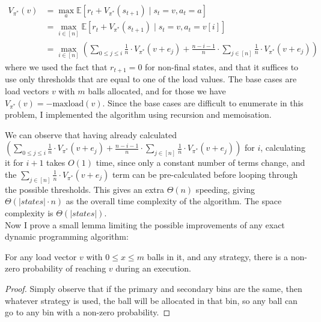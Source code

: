 \begin{equation} \label{eq:twothinning-dynamicprogramming}
\begin{split}
    V_{\pi^*}(v) &= \max_a \mathbb{E} [r_t + V_{\pi^*}(s_{t+1}) \mid s_t=v, a_t=a] \\
    &= \max_{i \in [n]} \mathbb{E} [r_t + V_{\pi^*}(s_{t+1}) \mid s_t=v, a_t=v[i]] \\
    &= \max_{i \in [n]} \left(\sum_{0\leq j \leq i} \frac{1}{n}\cdot V_{\pi^*}(v+e_j) + \frac{n-i-1}{n} \cdot  \sum_{j \in [n]} \frac{1}{n}\cdot V_{\pi^*}(v+e_j) \right)
\end{split}
\end{equation}
where we used the fact that $r_{t+1}=0$ for non-final states, and that it suffices to use only thresholds that are equal to one of the load values. The base cases are load vectors $v$ with $m$ balls allocated, and for those we have $V_{\pi^*}(v)=-\mathrm{maxload}(v)$. Since the base cases are difficult to enumerate in this problem, I implemented the algorithm using recursion and memoisation. 


We can observe that having already calculated $(\sum_{0\leq j \leq i} \frac{1}{n}\cdot V_{\pi^*}(v+e_j) + \frac{n-i-1}{n} \cdot  \sum_{j \in [n]} \frac{1}{n}\cdot V_{\pi^*}(v+e_j))$ for $i$, calculating it for $i+1$ takes $O(1)$ time, since only a constant number of terms change, and the $\sum_{j \in [n]} \frac{1}{n}\cdot V_{\pi^*}(v+e_j)$ term can be pre-calculated before looping through the possible thresholds. This gives an extra $\Theta(n)$ speeding, giving $\Theta(|states|\cdot n)$ as the overall time complexity of the algorithm. The space complexity is $\Theta(|states|)$.\\


Now I prove a small lemma limiting the possible improvements of any exact dynamic programming algorithm:


\begin{lemma} \label{lemma: everystatereachable}
For any load vector $v$ with $0\leq x\leq m$ balls in it, and any strategy, there is a non-zero probability of reaching $v$ during an execution.
\end{lemma}

\begin{proof}
    Simply observe that if the primary and secondary bins are the same, then whatever strategy is used, the ball will be allocated in that bin, so any ball can go to any bin with a non-zero probability.
\end{proof}

